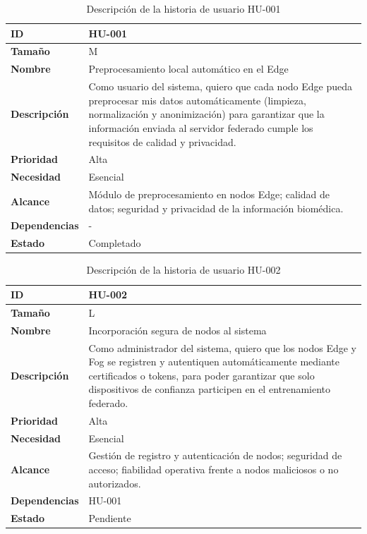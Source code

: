 \documentclass{report}
\begin{document}
\begin{table}[H]
\centering
\caption{Descripción de la historia de usuario HU-001}
\label{tab:hu001}
\begin{tabular}{|l|p{12cm}|}
\hline
\textbf{ID} & HU-001 \\ \hline
\textbf{Tamaño} & M \\ \hline
\textbf{Nombre} & Preprocesamiento local automático en el Edge \\ \hline
\textbf{Descripción} & 
Como usuario del sistema, quiero que cada nodo Edge pueda preprocesar mis datos automáticamente (limpieza, normalización y anonimización) para garantizar que la información enviada al servidor federado cumple los requisitos de calidad y privacidad. \\ \hline
\textbf{Prioridad} & Alta \\ \hline
\textbf{Necesidad} & Esencial \\ \hline
\textbf{Alcance} & Módulo de preprocesamiento en nodos Edge; calidad de datos; seguridad y privacidad de la información biomédica. \\ \hline
\textbf{Dependencias} & - \\ \hline
\textbf{Estado} & Completado \\ \hline
\end{tabular}
\end{table}



\begin{table}[H]
\centering
\caption{Descripción de la historia de usuario HU-002}
\label{tab:hu002}
\begin{tabular}{|l|p{12cm}|}
\hline
\textbf{ID} & HU-002 \\ \hline
\textbf{Tamaño} & L \\ \hline
\textbf{Nombre} & Incorporación segura de nodos al sistema \\ \hline
\textbf{Descripción} & 
Como administrador del sistema, quiero que los nodos Edge y Fog se registren y autentiquen automáticamente mediante certificados o tokens, para poder garantizar que solo dispositivos de confianza participen en el entrenamiento federado. \\ \hline
\textbf{Prioridad} & Alta \\ \hline
\textbf{Necesidad} & Esencial \\ \hline
\textbf{Alcance} & Gestión de registro y autenticación de nodos; seguridad de acceso; fiabilidad operativa frente a nodos maliciosos o no autorizados. \\ \hline
\textbf{Dependencias} & HU-001 \\ \hline
\textbf{Estado} & Pendiente \\ \hline
\end{tabular}
\end{table}
\end{document}
